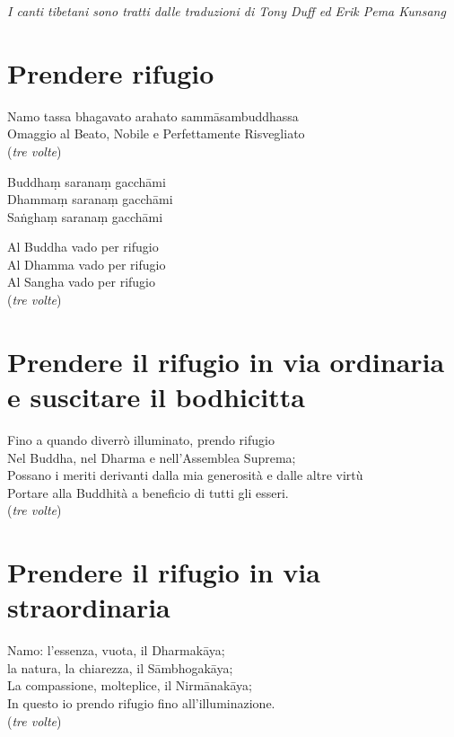 
\begingroup\setlength{\parindent}{0em}\setlength{\parskip}{0.8em}

\noindent\textit{I canti tibetani sono tratti dalle traduzioni di Tony Duff ed Erik Pema Kunsang}



\section{Prendere rifugio}
\vspace*{-1em}\noindent{}

Namo tassa bhagavato arahato sammāsambuddhassa \\
Omaggio al Beato, Nobile e Perfettamente Risvegliato \\
(\textit{tre volte})

Buddhaṃ saranaṃ gacch\=ami \\
Dhammaṃ saranaṃ gacch\=ami \\
Saṅghaṃ saranaṃ gacch\=ami

Al Buddha vado per rifugio \\
Al Dhamma vado per rifugio \\
Al Sangha vado per rifugio \\
(\textit{tre volte})

\section{Prendere il rifugio in via ordinaria e suscitare il bodhicitta}
\vspace*{-1em}\noindent{}

Fino a quando diverrò illuminato, prendo rifugio \\
Nel Buddha, nel Dharma e nell'Assemblea Suprema; \\
Possano i meriti derivanti dalla mia generosità e dalle altre virtù \\
Portare alla Buddhità a beneficio di tutti gli esseri. \\
(\textit{tre volte})

\section{Prendere il rifugio in via straordinaria}
\vspace*{-1em}\noindent{}

Namo: l'essenza, vuota, il Dharmakāya; \\
la natura, la chiarezza, il Sāmbhogakāya; \\
La compassione, molteplice, il Nirmānakāya; \\
In questo io prendo rifugio fino all'illuminazione. \\
(\textit{tre volte})

